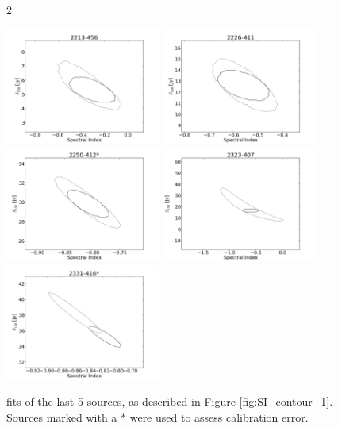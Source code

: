 \documentclass[preprint]{aastex}
\begin{document}
\clearpage
\begin{figure}[htbp]2\begin{center}
\includegraphics[width=2in]{plots/2213-456_SI_MCMC.png} %
\includegraphics[width=2in]{plots/2226-411_SI_MCMC.png} %
\includegraphics[width=2in]{plots/2250-412_SI_MCMC.png} %
\includegraphics[width=2in]{plots/2323-407_SI_MCMC.png} %
\includegraphics[width=2in]{plots/2331-416_SI_MCMC.png} %
\end{center}
\caption{fits of the last 5 sources, as described in Figure \ref{fig:SI_contour_1}. Sources marked with a
* were used to assess calibration error.
}\label{fig:SI_contour_5}
\end{figure}%
\end{document}
